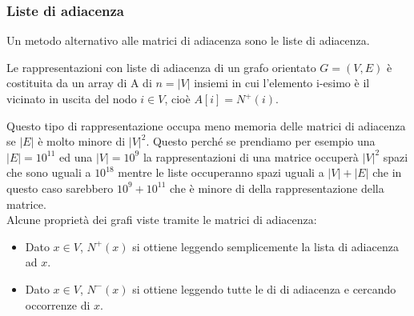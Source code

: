 \subsubsection{Liste di adiacenza}
Un metodo alternativo alle matrici di adiacenza sono le liste di adiacenza.
\begin{definition}
    Le rappresentazioni con liste di adiacenza di un grafo orientato $G = (V,E)$ è costituita da un array di A di $n = |V|$ insiemi in cui l'elemento i-esimo è il vicinato in uscita del nodo $i \in V$, cioè $A[i] = N^+(i)$.
\end{definition}
Questo tipo di rappresentazione occupa meno memoria delle matrici di adiacenza se $|E|$ è molto minore di $|V|^2$. Questo perché se prendiamo per esempio una $|E| = 10^{11}$ ed una $|V| = 10^9$ la rappresentazioni di una matrice occuperà $|V|^2$ spazi che sono uguali a $10^{18}$ mentre le liste occuperanno spazi uguali a $|V| + |E|$ che in questo caso sarebbero $10^9 + 10^{11}$ che è minore di della rappresentazione della matrice.\\
Alcune proprietà dei grafi viste tramite le matrici di adiacenza:
\begin{itemize}
    \item Dato $x \in V$, $N^+(x)$ si ottiene leggendo semplicemente la lista di adiacenza ad $x$.
    \item Dato $x \in V$, $N^-(x)$ si ottiene leggendo tutte le di di adiacenza e cercando occorrenze di $x$.
\end{itemize}



